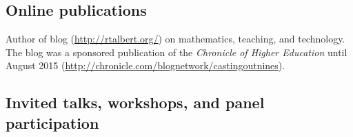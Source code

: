 \documentclass[letterpaper]{article}
\renewenvironment{itemize}{
  \begin{list}{}{
    \setlength{\leftmargin}{1.5em}
	\setlength{\itemsep}{0in}
  }
}{
  \end{list}
}
\begin{document}
\subsection*{Online publications}

\begin{itemize}
	\item Author of blog (\url{http://rtalbert.org/}) on mathematics, teaching, and technology. The blog was a sponsored publication of the \emph{Chronicle of Higher Education} until August 2015 (\url{http://chronicle.com/blognetwork/castingoutnines}).
\end{itemize}


\subsection*{Invited talks, workshops, and panel participation}
\end{document}
